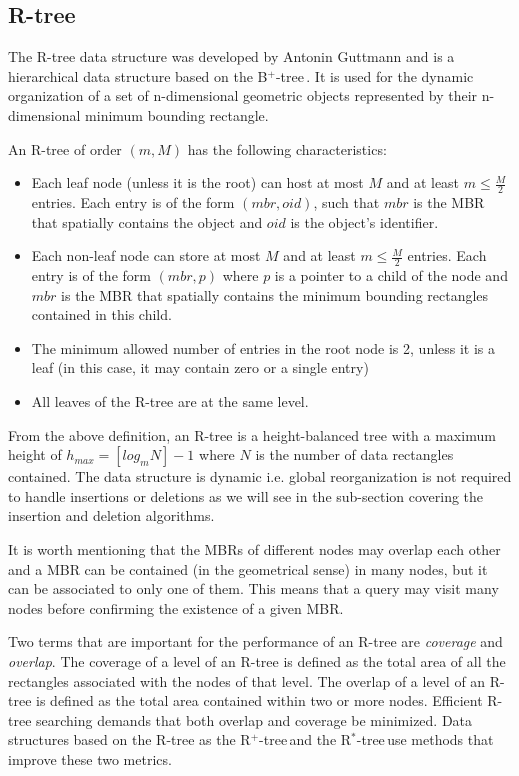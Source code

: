 \documentclass[11pt, a4paper, oneside]{article}
\newcommand{\rplus}{R$^+$-tree$\,$}
\newcommand{\rstar}{R$^*$-tree$\,$}
\newcommand{\bplus}{B$^+$-tree$\,$}
\begin{document}
\subsection{R-tree}
The R-tree data structure was developed by Antonin Guttmann\cite{Guttman:1984:RDI:602259.602266} and is a hierarchical data structure based on the \bplus. It is used for the dynamic organization of a set of n-dimensional geometric objects represented by their n-dimensional minimum bounding rectangle. 

An R-tree of order $(m, M)$ has the following characteristics:
\begin{itemize}
\item Each leaf node (unless it is the root) can host at most $M$ and at least $m\leq \frac{M}{2}$ entries. Each entry is of the form $(mbr, oid)$, such that $mbr$ is the MBR that spatially contains the object and $oid$ is the object's identifier.
\item Each non-leaf node can store at most $M$ and at least $m\leq \frac{M}{2}$ entries. Each entry is of the form $(mbr, p)$ where $p$ is a pointer to a child of the node and $mbr$ is the MBR that spatially contains the minimum bounding rectangles contained in this child.
\item The minimum allowed number of entries in the root node is 2, unless it is a leaf (in this case, it may contain zero or a single entry)
\item All leaves of the R-tree are at the same level.
\end{itemize}

From the above definition, an R-tree is a height-balanced tree with a maximum height of $h_{max}=[log_mN]-1$ where $N$ is the number of data rectangles contained. The data structure is dynamic i.e. global reorganization is not required to handle insertions or deletions as we will see in the sub-section covering the insertion and deletion algorithms. 

It is worth mentioning that the MBRs of different nodes may overlap each other and a MBR can be contained (in the geometrical sense) in many nodes, but it can be associated to only one of them. This means that a query may visit many nodes before confirming the existence of a given MBR.

Two terms that are important for the performance of an R-tree are \textit{coverage} and \textit{overlap}. The coverage of a level of an R-tree is defined as the total area of all the rectangles associated with the nodes of that level. The overlap of a level of an R-tree is defined as the total area contained within two or more nodes. Efficient R-tree searching demands that both
overlap and coverage be minimized. Data structures based on the R-tree as the \rplus and the \rstar use methods that improve these two metrics. 
\end{document}

